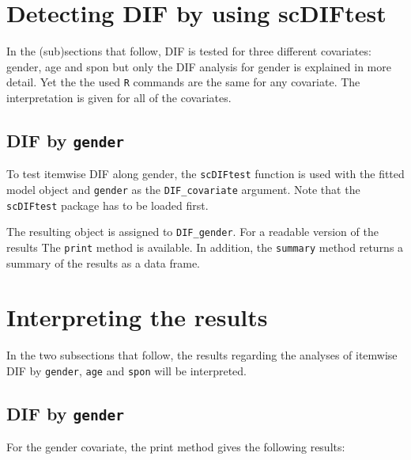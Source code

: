 \documentclass{article}
\begin{document}
\section{Detecting DIF by using scDIFtest}

In the (sub)sections that follow, DIF is tested for three different covariates: gender, age and spon but only the DIF analysis for gender is explained in more detail. Yet the the used {\tt R} commands are the same for any covariate. The interpretation is given for all of the covariates.

\subsection{DIF by {\tt gender}}

To test itemwise DIF along gender, the {\tt scDIFtest} function is used with the fitted model object and {\tt gender} as the {\tt DIF\_covariate} argument. Note that the {\tt scDIFtest} package has to be loaded first.

\begin{Schunk}
\end{Schunk}
  

The resulting object is assigned to {\tt DIF\_gender}. For a readable version of the results The {\tt print} method is available. In addition, the {\tt summary} method returns a summary of the results as a data frame.

\section{Interpreting the results}

In the two subsections that follow, the results regarding the analyses of itemwise DIF by {\tt gender}, {\tt age} and {\tt spon} will be interpreted.

\subsection{DIF by {\tt gender} }

For the gender covariate, the print method gives the following results: 
\end{document}
